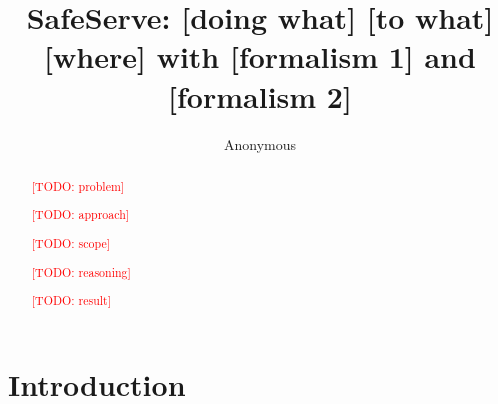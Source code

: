 \documentclass[runningheads]{llncs}
\newcommand{\todo}[1]{\textcolor{red}{[TODO: #1]}}
\begin{document}
\title{SafeServe: [doing what] [to what] [where] with [formalism 1] and [formalism 2]}
\titlerunning{\todo{short title}}

\author{Anonymous}

\maketitle

\begin{abstract}
\todo{problem}

\todo{approach}

\todo{scope}

\todo{reasoning}

\todo{result}

\keywords{\todo{keyword} \and \todo{keyword} \and \todo{keyword}}
\end{abstract}

\section{Introduction}
\end{document}
